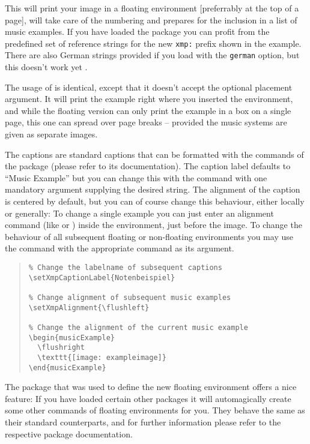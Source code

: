 \documentclass[../openLilyLib]{subfiles}
\begin{document}
This will print your image in a floating environment [preferrably at the top of a page], will take care of the numbering and prepares for the inclusion in a list of music examples.
If you have loaded the  package you can profit from the predefined set of reference strings for the new \texttt{xmp:} prefix shown in the example.
There are also German strings provided if you load  with the \texttt{german} option, but this doesn't work yet .

The usage of  is identical, except that it doesn't accept the optional placement argument.
It will print the example right where you inserted the environment, and while the floating version can only print the example in a box on a single page, this one can spread over page breaks -- provided the music systems are given as separate images.

The captions are standard captions that can be formatted with the commands of the  package (please refer to its documentation).
The caption label defaults to “Music Example” but you can change this with the command  with one mandatory argument supplying the desired string.
The alignment of the caption is centered by default, but you can of course change this behaviour, either locally or generally:
To change a single example you can just enter an alignment command (like  or ) inside the environment, just before the image.
To change the behaviour of all subsequent floating or non-floating environments you may use the  command with the appropriate command as its argument.

\begin{quote}
\begin{verbatim}
% Change the labelname of subsequent captions
\setXmpCaptionLabel{Notenbeispiel}

% Change alignment of subsequent music examples
\setXmpAlignment{\flushleft}

% Change the alignment of the current music example
\begin{musicExample}
  \flushright
  \texttt{[image: exampleimage]}
\end{musicExample}
\end{verbatim}
\end{quote}

The  package that was used to define the new floating environment offers a nice feature:
If you have loaded certain other packages it will automagically create some other commands of floating environments for you.
They behave the same as their standard counterparts, and for further information please refer to the respective package documentation.
\end{document}
